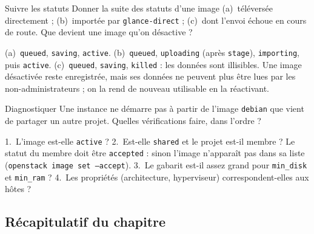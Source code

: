 \begin{exercice}{Suivre les statuts}\label{ex:gl-statuts}
Donner la suite des statuts d'une image (a)~téléversée directement ; (b)~importée par \texttt{glance-direct} ; (c)~dont l'envoi
échoue en cours de route. Que devient une image qu'on désactive ?
\end{exercice}
\begin{correction}
(a)~\texttt{queued}, \texttt{saving}, \texttt{active}. (b)~\texttt{queued}, \texttt{uploading} (après \texttt{stage}), \texttt{importing}, puis
\texttt{active}. (c)~\texttt{queued}, \texttt{saving}, \texttt{killed} : les données sont illisibles. Une image désactivée reste
enregistrée, mais ses données ne peuvent plus être lues par les non-administrateurs ; on la rend de nouveau utilisable
en la réactivant.
\end{correction}

\begin{exercice}{Diagnostiquer}\label{ex:gl-diag}
Une instance ne démarre pas à partir de l'image \texttt{debian} que vient de partager un autre projet. Quelles vérifications
faire, dans l'ordre ?
\end{exercice}
\begin{correction}
1.~L'image est-elle \texttt{active} ? 2.~Est-elle \texttt{shared} et le projet est-il membre ? Le statut du membre doit être
\texttt{accepted} : sinon l'image n'apparaît pas dans sa liste (\texttt{openstack image set --accept}). 3.~Le gabarit est-il assez
grand pour \texttt{min\_disk} et \texttt{min\_ram} ? 4.~Les propriétés (architecture, hyperviseur) correspondent-elles aux hôtes ?
\end{correction}

\subsection{Récapitulatif du chapitre}\label{sec:gl-recap}

